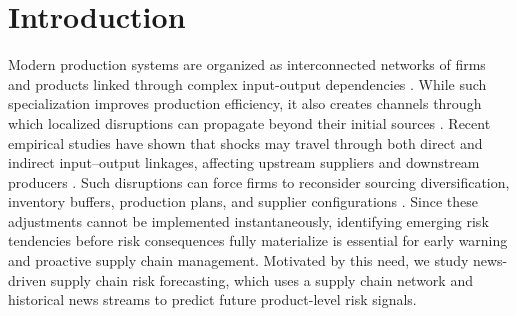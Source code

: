 \documentclass[letterpaper]{article} %
\begin{document}
\section{Introduction}
Modern production systems are organized as interconnected networks of firms and products linked through complex input-output dependencies \cite{baldwin2022risks,elliott2022supply}. While such specialization improves production efficiency, it also creates channels through which localized disruptions can propagate beyond their initial sources \cite{elliott2022supply,grossman2023resilience}. Recent empirical studies have shown that shocks may travel through both direct and indirect input--output linkages, affecting upstream suppliers and downstream producers \cite{lafrogne2023supply,demir2024financial,meier2024covid}. Such disruptions can force firms to reconsider sourcing diversification, inventory buffers, production plans, and supplier configurations \cite{grossman2023resilience,lafrogne2023supply}. Since these adjustments cannot be implemented instantaneously, identifying emerging risk tendencies before risk consequences fully materialize is essential for early warning and proactive supply chain management. Motivated by this need, we study news-driven supply chain risk forecasting, which uses a supply chain network and historical news streams to predict future product-level risk signals.
\end{document}

